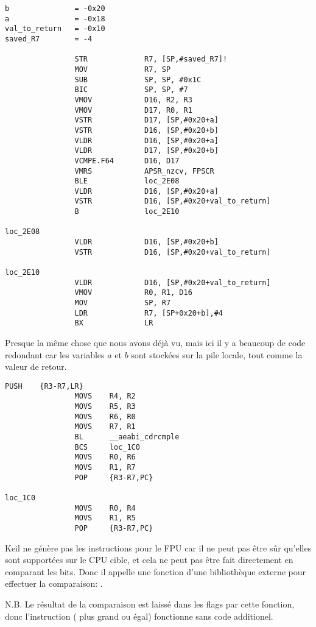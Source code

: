 \myparagraph{\NonOptimizingXcodeIV (\ARMMode)}

\begin{lstlisting}[caption=\NonOptimizingXcodeIV (\ARMMode),style=customasmARM]
b               = -0x20
a               = -0x18
val_to_return   = -0x10
saved_R7        = -4

                STR             R7, [SP,#saved_R7]!
                MOV             R7, SP
                SUB             SP, SP, #0x1C
                BIC             SP, SP, #7
                VMOV            D16, R2, R3
                VMOV            D17, R0, R1
                VSTR            D17, [SP,#0x20+a]
                VSTR            D16, [SP,#0x20+b]
                VLDR            D16, [SP,#0x20+a]
                VLDR            D17, [SP,#0x20+b]
                VCMPE.F64       D16, D17
                VMRS            APSR_nzcv, FPSCR
                BLE             loc_2E08
                VLDR            D16, [SP,#0x20+a]
                VSTR            D16, [SP,#0x20+val_to_return]
                B               loc_2E10

loc_2E08
                VLDR            D16, [SP,#0x20+b]
                VSTR            D16, [SP,#0x20+val_to_return]

loc_2E10
                VLDR            D16, [SP,#0x20+val_to_return]
                VMOV            R0, R1, D16
                MOV             SP, R7
                LDR             R7, [SP+0x20+b],#4
                BX              LR
\end{lstlisting}

Presque la même chose que nous avons déjà vu, mais ici il y a beaucoup de code redondant
car les variables $a$ et $b$ sont stockées sur la pile locale, tout comme la valeur
de retour.

\myparagraph{\OptimizingKeilVI (\ThumbMode)}

\begin{lstlisting}[caption=\OptimizingKeilVI (\ThumbMode),style=customasmARM]
                PUSH    {R3-R7,LR}
                MOVS    R4, R2
                MOVS    R5, R3
                MOVS    R6, R0
                MOVS    R7, R1
                BL      __aeabi_cdrcmple
                BCS     loc_1C0
                MOVS    R0, R6
                MOVS    R1, R7
                POP     {R3-R7,PC}

loc_1C0
                MOVS    R0, R4
                MOVS    R1, R5
                POP     {R3-R7,PC}
\end{lstlisting}


Keil ne génère pas les instructions pour le FPU car il ne peut pas être sûr qu'elles
sont supportées sur le CPU cible, et cela ne peut pas être fait directement en comparant
les bits.
Donc il appelle une fonction d'une bibliothèque externe pour effectuer la comparaison:
.

N.B. Le résultat de la comparaison est laissé dans les flags par cette fonction,
donc l'instruction  ( plus grand ou
égal) fonctionne sans code additionel.

